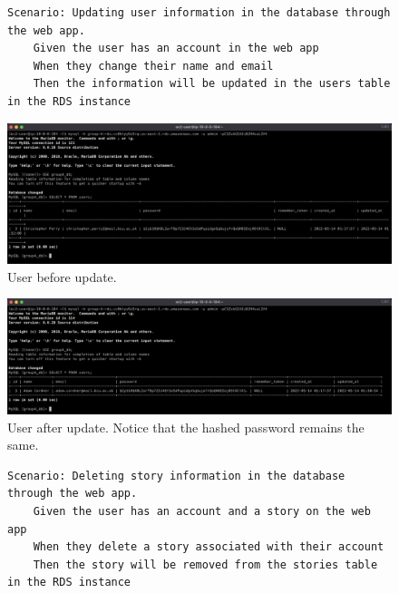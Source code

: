 \clearpage
\begin{figure}[!htbp]
    \centering
    \begin{verbatim}
Scenario: Updating user information in the database through the web app.
    Given the user has an account in the web app
    When they change their name and email
    Then the information will be updated in the users table in the RDS instance
    \end{verbatim}
    \label{fig:update-user-data}
\end{figure}

\begin{figure}[!htbp]
    \centering
    \includegraphics[width=\textwidth]{resources/rds/rds-testing-user-added}
    \caption{User before update.}
    \label{fig:rds-testing-user-before-update}
\end{figure}

\begin{figure}[!htbp]
    \centering
    \includegraphics[width=\textwidth]{resources/rds/rds-testing-update-after}
    \caption{User after update. Notice that the hashed password remains the same.}
    \label{fig:rds-testing-user-after-update}
\end{figure}

\clearpage
\begin{figure}[!htbp]
    \centering
    \begin{verbatim}
Scenario: Deleting story information in the database through the web app.
    Given the user has an account and a story on the web app
    When they delete a story associated with their account
    Then the story will be removed from the stories table in the RDS instance
    \end{verbatim}
    \label{fig:delete-story-data}
\end{figure}

